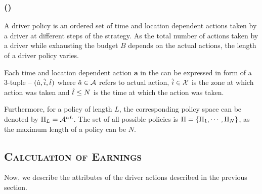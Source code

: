 \subsubsection{ (\policy)}

A driver policy is an ordered set of time and location dependent actions taken by a driver at different steps of the strategy. As the total number of actions taken by a driver while exhausting the budget $B$ depends on the actual actions, the length
of a driver policy {\policy} varies. 

Each time and location dependent action $\mathbf{a}$ in the {\policy} can be expressed in form of a 3-tuple -- $(\hat{a}, \hat{i}, \hat{t})$
where $\hat{a} \in \mathcal{A}$ refers to actual action, $\hat{i} \in \mathcal{X}$ is the zone at which action was taken and $\hat{t} \leq N$ is the 
time at which the action was taken.



Furthermore, for a policy of length $L$, the corresponding policy space can be denoted by
$\Pi_L = \mathcal{A}^{nL}$. The set of all possible policies is $\Pi = \{\Pi_1, \cdots, \Pi_N\}$, as the maximum length of a policy can be $N$.


\subsection{\textsc{Calculation of Earnings}}
Now, we describe the attributes of the driver actions described in the previous section.

\subsubsection{}

